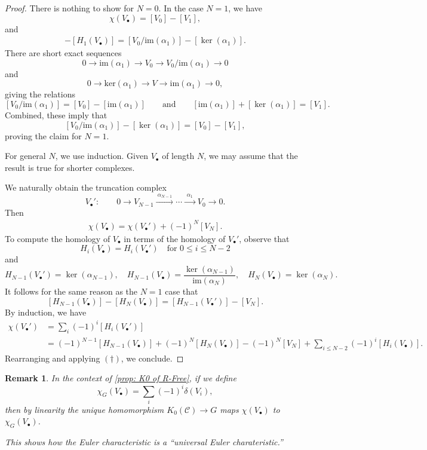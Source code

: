 \documentclass[12pt,reqno]{amsart}
\theoremstyle{plain}
\newtheorem{rem}[thm]{Remark}
\numberwithin{equation}{section}
\begin{document}
\begin{proof}
    There is nothing to show for $N = 0$. In the case $N=1$, we have
    \[\chi(V_\bullet) = [V_0]-[V_1],\]
    and
    \begin{align*}
        [H_0(V_{\bullet})] - [H_1(V_\bullet)] = [V_0/\mathrm{im}(\alpha_1)] - [\ker(\alpha_1)].
    \end{align*}
    There are short exact sequences
    \[0 \longrightarrow \mathrm{im}(\alpha_1) \longrightarrow V_0 \longrightarrow V_0/\mathrm{im}(\alpha_1) \longrightarrow 0\]
    and
    \[0 \longrightarrow \mathrm{ker}(\alpha_1) \longrightarrow V \longrightarrow \mathrm{im}(\alpha_1) \longrightarrow 0,\]
    giving the relations
    \[[V_0/\mathrm{im}(\alpha_1)]  = [V_0]-[\mathrm{im}(\alpha_1)]\qquad \text{and}\qquad [\mathrm{im}(\alpha_1)] + [\ker(\alpha_1)] = [V_1].\] 
    Combined, these imply that 
    \[[V_0/\mathrm{im}(\alpha_1)] - [\ker(\alpha_1)] = [V_0]-[V_1],\]
    proving the claim for $N=1$.

    For general $N$, we use induction. Given $V_\bullet$ of length $N$, we may assume that the result is true for shorter complexes. 

    We naturally obtain the truncation complex
    \[V_\bullet ' : \qquad 0 \longrightarrow V_{N-1}\xrightarrow{\ \alpha_{N-1}\ } \cdots \xrightarrow{\ \, \alpha_1 \, \ }V_0 \longrightarrow 0.\]
    Then
    \begin{align*}
        \chi(V_\bullet) = \chi(V_\bullet') + (-1)^N [V_N].\tag{$\dag$}
    \end{align*}
    To compute the homology of $V_\bullet$ in terms of the homology of $V_\bullet'$, observe that
    \[H_i(V_\bullet) = H_i(V_\bullet') \quad \text{for $0\le i\le N-2$}\]
    and
    \[H_{N-1}(V_\bullet') = \ker(\alpha_{N-1}),\quad H_{N-1}(V_\bullet) = \frac{\ker(\alpha_{N-1})}{\mathrm{im}(\alpha_N)},\quad H_N(V_\bullet) = \ker(\alpha_N).\]
    It follows for the same reason as the $N=1$ case that
    \[[H_{N-1}(V_\bullet)] -[H_N(V_\bullet)] = [H_{N-1}(V_\bullet')]-[V_N].\]
    By induction, we have
    \begin{align*}
        \chi(V_\bullet') &= \sum_{i} (-1)^i [H_i(V_\bullet')]\\ &= (-1)^{N-1}[H_{N-1}(V_\bullet)] + (-1)^{N}[H_{N}(V_\bullet)] -(-1)^N[V_N]+ \sum_{i\le N-2}(-1)^i[H_i(V_\bullet)].
    \end{align*}
    Rearranging and applying $(\dag)$, we conclude.
\end{proof}


\begin{rem}\label{rem: uprop of Eulerchar} In the context of \cref{prop: K0 of R-Free}, if we define
\[\chi_G(V_\bullet) = \sum_i (-1)^i \delta(V_i),\]
then by linearity the unique homomorphism $K_0(\mathcal{C}) \to G$ maps $\chi(V_\bullet)$ to $\chi_G(V_\bullet)$. 

This shows how the Euler characteristic is a ``universal Euler charateristic.''
\end{rem}    
\end{document}
